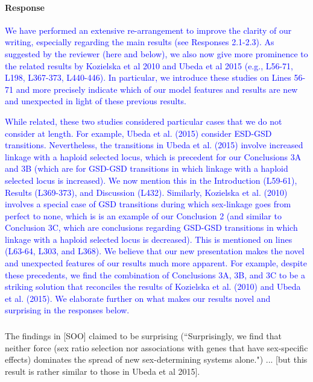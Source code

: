 \documentclass[10pt,letterpaper]{article}
\begin{document}
\noindent\paragraph{Response}
\textcolor{blue}{
We have performed an extensive re-arrangement to improve the clarity of our writing, especially regarding the main results (see Responses 2.1-2.3). 
As suggested by the reviewer (here and below), we also now give more prominence to the related results by Kozielska et al 2010 and Ubeda et al 2015 (e.g., L56-71, L198, L367-373, L440-446). 
In particular, we introduce these studies on Lines 56-71 and more precisely indicate which of our model features and results are new and unexpected in light of these previous results.
}

\textcolor{blue}{
While related, these two studies considered particular cases that we do not consider at length. 
For example, Ubeda et al. (2015) consider ESD-GSD transitions. 
Nevertheless, the transitions in Ubeda et al. (2015) involve increased linkage with a haploid selected locus, which is precedent for our Conclusions 3A and 3B (which are for GSD-GSD transitions in which linkage with a haploid selected locus is increased).
We now mention this in the Introduction (L59-61), Results (L369-373), and Discussion (L432).  
Similarly, Kozielska et al. (2010) involves a special case of GSD transitions during which sex-linkage goes from perfect to none, which is is an example of our Conclusion 2 (and similar to Conclusion 3C, which are conclusions regarding GSD-GSD transitions in which linkage with a haploid selected locus is decreased).
This is mentioned on lines (L63-64, L303, and L368). 
We believe that our new presentation makes the novel and unexpected features of our results much more apparent. 
For example, despite these precedents, we find the combination of Conclusions 3A, 3B, and 3C to be a striking solution that reconciles the results of Kozielska et al. (2010) and Ubeda et al. (2015). 
We elaborate further on what makes our results novel and surprising in the responses below.
}

\noindent\subsubsection{}
The findings in [SOO] claimed to be surprising (``Surprisingly, we find that neither force (sex ratio selection nor associations with genes that have sex-specific effects) dominates the spread of new sex-determining systems alone.") ... [but this result is rather similar to those in Ubeda et al 2015]. 
\end{document}
